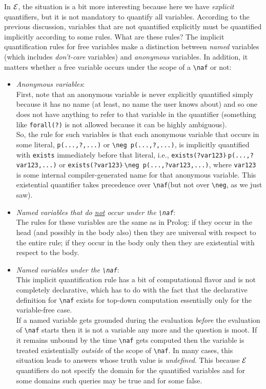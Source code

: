 \documentclass[11pt]{article}
\newcommand{\ERGO}{\mbox{\ensuremath{\cal{E}}\smaller{{\sc{RGO}}}}\xspace}
\newcommand{\FLSYSTEM}{\ERGO}
\newcommand{\bs}{\textbackslash}
\newcommand{\RULELOGNAF}{{\texttt{{\bs}naf}}\xspace}
\newcommand{\RULELOGNEG}{{\texttt{{\bs}neg}}\xspace}
\begin{document}
In \FLSYSTEM, the situation is a bit more interesting because here we have
\emph{explicit} quantifiers, but it is not mandatory to quantify all
variables. According to the previous discussion,
variables that are not quantified explicitly must be
quantified implicitly according to some rules. What are these rules?
The implicit quantification rules for free variables
make a distinction between \emph{named}
variables (which includes \emph{don't-care} variables) and \emph{anonymous}
variables. In addition, it matters whether a free variable occurs under the
scope of a \RULELOGNAF or not:
\begin{itemize}
\item  \emph{Anonymous variables}:\\
  First, note that an anonymous variable is never explicitly quantified
  simply because it has no name (at least, no name the user knows about)
  and so one does not have anything to refer to that variable in the
  quantifier (something like \texttt{forall(?)} is not allowed because it
  can be highly ambiguous).
  \\
  So, the rule for such variables is that each anonymous variable
  that occurs in some literal, \texttt{p(...,?,...)} or 
  \texttt{\RULELOGNEG p(...,?,...)}, 
  is implicitly quantified with \texttt{exists} immediately before that
  literal, i.e., \texttt{exists(?var123)$\hat{~}$p(...,?var123,...)}
  or \texttt{exists(?var123)$\hat{~}$\RULELOGNEG p(...,?var123,...)}, where
  \texttt{var123} is some internal compiler-generated
  name for that anonymous variable. This existential quantifier takes
  precedence over \RULELOGNAF (but not over \RULELOGNEG, as we just saw).
\item \emph{Named variables that do \underline{not} occur under the \RULELOGNAF}:\\
  The rules for these variables are the same as in Prolog: if they occur
  in the head (and possibly in the body also)
  then they are universal with respect to the entire rule; if
  they occur in the body only then they are existential with respect to the
  body.
\item \emph{Named variables under the \RULELOGNAF}:\\
  This implicit quantification rule has a bit of computational flavor and is
  not completely
  declarative, which has to do with the fact that the declarative
  definition for \RULELOGNAF  exists for top-down computation essentially
  only for the variable-free case.\\
  If a named variable gets grounded during the evaluation \emph{before}
  the evaluation of
  \RULELOGNAF starts then it is not a variable any more and the question is
  moot. If it remains unbound by the time \RULELOGNAF gets computed then 
  the variable
  is treated existentially \emph{outside} of the scope of \RULELOGNAF.
  In many cases, this situation leads to answers whose truth value is
  \emph{undefined}. This because \FLSYSTEM quantifiers do not specify the
  domain for the quantified variables and for some domains
  such queries may be true and for some false.
\end{itemize}
\end{document}
